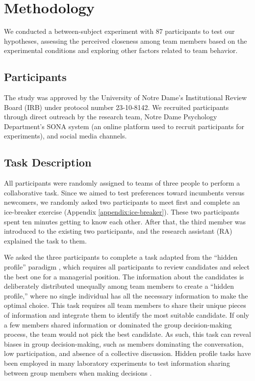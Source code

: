 \section{Methodology}
\label{methodology}
We conducted a between-subject experiment with 87 participants to test our hypotheses, assessing the perceived closeness among team members based on the experimental conditions and exploring other factors related to team behavior. 

\subsection{Participants}
The study was approved by the University of Notre Dame's Institutional Review Board (IRB) under protocol number 23-10-8142. We recruited participants through direct outreach by the research team, Notre Dame Psychology Department's SONA system (an online platform used to recruit participants for experiments), and social media channels. 


\subsection{Task Description}
All participants were randomly assigned to teams of three people to perform a collaborative task. Since we aimed to test preferences toward incumbents versus newcomers, we randomly asked two participants to meet first and complete an ice-breaker exercise (Appendix \ref{appendix:ice-breaker}). These two participants spent ten minutes getting to know each other. After that, the third member was introduced to the existing two participants, and the research assistant (RA) explained the task to them.

We asked the three participants to complete a task adapted from the ``hidden profile'' paradigm \cite{stasser1985pooling}, which requires all participants to review candidates and select the best one for a managerial position. The information about the candidates is deliberately distributed unequally among team members to create a ``hidden profile,'' where no single individual has all the necessary information to make the optimal choice. This task requires all team members to share their unique pieces of information and integrate them to identify the most suitable candidate. If only a few members shared information or dominated the group decision-making process, the team would not pick the best candidate. As such, this task can reveal biases in group decision-making, such as members dominating the conversation, low participation, and absence of a collective discussion. Hidden profile tasks have been employed in many laboratory experiments to test information sharing between group members when making decisions \cite{Goyal2014,mentis2009,mennecke1997using}. 

